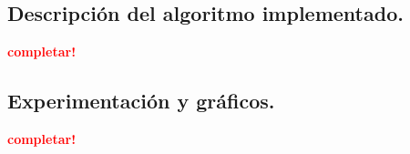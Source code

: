\subsection{Descripción del algoritmo implementado.}
\vspace*{0.3cm}
\textcolor{red}{\textbf{completar!}}



\newpage
\subsection{Experimentación y gráficos.}
\vspace*{0.3cm}
\textcolor{red}{\textbf{completar!}}
